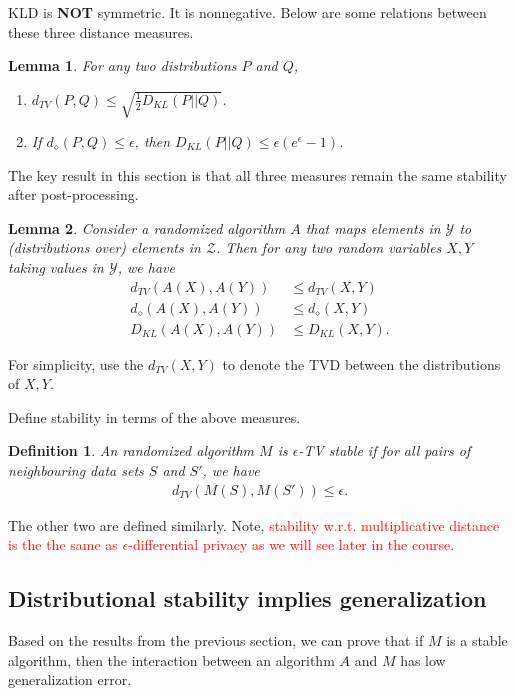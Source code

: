 \documentclass[]{article}
\newtheorem{lemma}{Lemma}[section]
\newtheorem{definition}{Definition}[section] %
\begin{document}
KLD is \textbf{NOT} symmetric. It is nonnegative. Below are some relations between these three distance measures. 

\begin{lemma}
	For any two distributions $P$ and $Q$, 
	\begin{enumerate}
		\item $d_{TV}(P,Q) \le \sqrt{\frac{1}{2}D_{KL}(P||Q)}$.
		\item If $d_{\diamond}(P,Q) \le \epsilon$, then $D_{KL}(P||Q) \le \epsilon(e^{\epsilon}-1)$.
	\end{enumerate}
\end{lemma}

The key result in this section is that all three measures remain the same stability after post-processing. 

\begin{lemma}
	Consider a randomized algorithm $A$ that maps elements in $\mathcal{Y}$ to (distributions over) elements in $\mathcal{Z}$. Then for any two random variables $X,Y$ taking values in $\mathcal{Y}$, we have 
	\begin{align*}
		d_{TV}(A(X),A(Y)) &\le d_{TV}(X,Y)\\
        d_{\diamond}(A(X),A(Y)) &\le d_{\diamond}(X,Y)\\
        D_{KL}(A(X),A(Y)) &\le D_{KL}(X,Y).
	\end{align*}
\end{lemma}
For simplicity, use the $d_{TV}(X,Y)$ to denote the TVD between the distributions of $X,Y$.

Define stability in terms of the above measures. 

\begin{definition}
	An randomized algorithm $M$ is $\epsilon$-TV stable if for all pairs of neighbouring data sets $S$ and $S'$, we have 
	\begin{align*}
		d_{TV}(M(S),M(S')) \le \epsilon.
	\end{align*}
\end{definition}
The other two are defined similarly. Note, \textcolor{red}{stability w.r.t. multiplicative distance is the the same as $\epsilon$-differential privacy as we will see later in the course}.

\subsection{Distributional stability implies generalization}
Based on the results from the previous section, we can prove that if $M$ is a stable algorithm, then the interaction between an algorithm $A$ and $M$ has low generalization error. 
\end{document}
